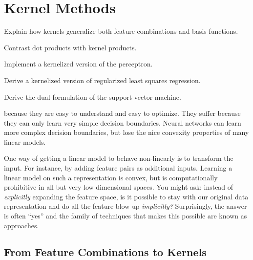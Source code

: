 \chapter{Kernel Methods} \label{sec:kernel}


\begin{learningobjectives}
\item Explain how kernels generalize both feature combinations and
  basis functions.
\item Contrast dot products with kernel products.
\item Implement a kernelized version of the perceptron.
\item Derive a kernelized version of regularized least squares
  regression.
\item Derive the dual formulation of the support vector machine.
\end{learningobjectives}

\dependencies{}

 because they are easy to
understand and easy to optimize.  They suffer because they can only
learn very simple decision boundaries.  Neural networks can learn more
complex decision boundaries, but lose the nice convexity properties of
many linear models.

One way of getting a linear model to behave non-linearly is to
transform the input.  For instance, by adding feature pairs as
additional inputs.  Learning a linear model on such a representation
is convex, but is computationally prohibitive in all but very low
dimensional spaces.  You might ask: instead of \emph{explicitly}
expanding the feature space, is it possible to stay with our original
data representation and do all the feature blow up \emph{implicitly?}
Surprisingly, the answer is often ``yes'' and the family of techniques
that makes this possible are known as  approaches.

\begin{comment}
   - From feature combinations and basis functions to kernels
   - Dot products versus kernels
   - Kernel/dual perceptron
   - Support vector machines
\end{comment}

\section{From Feature Combinations to Kernels}

